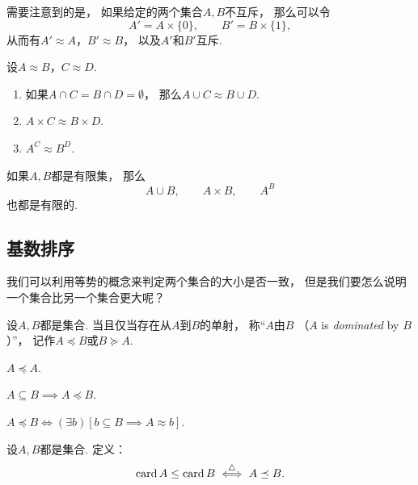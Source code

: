 需要注意到的是，
如果给定的两个集合\(A,B\)不互斥，
那么可以令\[
	A' = A\times\{0\}, \qquad
	B' = B\times\{1\},
\]
从而有\(A' \approx A\)，\(B' \approx B\)，
以及\(A'\)和\(B'\)互斥.

\begin{theorem}
设\(A \approx B\)，\(C \approx D\).
\begin{enumerate}
	\item 如果\(A \cap C = B \cap D = \emptyset\)，
	那么\(A \cup C \approx B \cup D\).
	\item \(A \times C \approx B \times D\).
	\item \(A^C \approx B^D\).
\end{enumerate}
\end{theorem}

\begin{theorem}
如果\(A,B\)都是有限集，
那么\[
	A \cup B, \qquad
	A \times B, \qquad
	A^B
\]也都是有限的.
\end{theorem}

\subsection{基数排序}
我们可以利用等势的概念来判定两个集合的大小是否一致，
但是我们要怎么说明一个集合比另一个集合更大呢？

\begin{definition}
设\(A,B\)都是集合.
当且仅当存在从\(A\)到\(B\)的单射，
称“\(A\)由\(B\) （\(A\) is \emph{dominated} by \(B\)）”，
记作\(A \preceq B\)或\(B \succeq A\).
\end{definition}

\begin{example}
\(A \preceq A\).
\end{example}

\begin{example}
\(A \subseteq B \implies A \preceq B\).
\end{example}

\begin{theorem}
\(A \preceq B
\iff
(\exists b)[b \subseteq B \implies A \approx b]\).
\end{theorem}

\begin{definition}
设\(A,B\)都是集合.
定义：\begin{equation}
	\operatorname{card} A \leq \operatorname{card} B \overset{\triangle}{\iff} A \preceq B.
\end{equation}
\end{definition}

